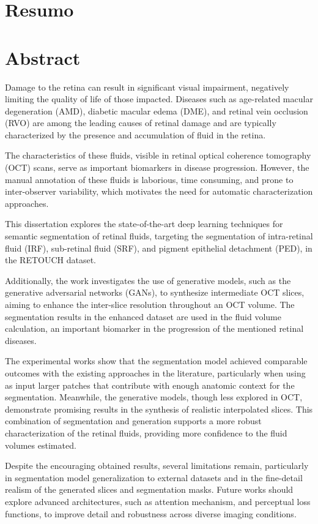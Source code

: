 \chapter*{Resumo}

\chapter*{Abstract}
Damage to the retina can result in significant visual impairment, negatively limiting the quality of life of those impacted. Diseases such as age-related macular degeneration (AMD), diabetic macular edema (DME), and retinal vein occlusion (RVO) are among the leading causes of retinal damage and are typically characterized by the presence and accumulation of fluid in the retina. 
\par
The characteristics of these fluids, visible in retinal optical coherence tomography (OCT) scans, serve as important biomarkers in disease progression. However, the manual annotation of these fluids is laborious, time consuming, and prone to inter-observer variability, which motivates the need for automatic characterization approaches.
\par
This dissertation explores the state-of-the-art deep learning techniques for semantic segmentation of retinal fluids, targeting the segmentation of intra-retinal fluid (IRF), sub-retinal fluid (SRF), and pigment epithelial detachment (PED), in the RETOUCH dataset. 
\par
Additionally, the work investigates the use of generative models, such as the generative adversarial networks (GANs), to synthesize intermediate OCT slices, aiming to enhance the inter-slice resolution throughout an OCT volume. The segmentation results in the enhanced dataset are used in the fluid volume calculation, an important biomarker in the progression of the mentioned retinal diseases.
\par
The experimental works show that the segmentation model achieved comparable outcomes with the existing approaches in the literature, particularly when using as input larger patches that contribute with enough anatomic context for the segmentation. Meanwhile, the generative models, though less explored in OCT, demonstrate promising results in the synthesis of realistic interpolated slices. This combination of segmentation and generation supports a more robust characterization of the retinal fluids, providing more confidence to the fluid volumes estimated.
\par
Despite the encouraging obtained results, several limitations remain, particularly in segmentation model generalization to external datasets and in the fine-detail realism of the generated slices and segmentation masks. Future works should explore advanced architectures, such as attention mechanism, and perceptual loss functions, to improve detail and robustness across diverse imaging conditions.